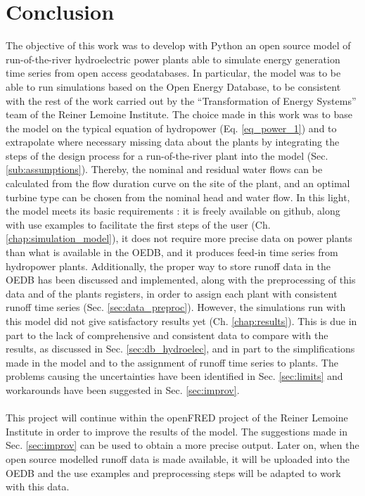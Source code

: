 \chapter{Conclusion}

The objective of this work was to develop with Python an open source model of run-of-the-river hydroelectric power plants able to simulate energy generation time series from open access geodatabases. In particular, the model was to be able to run simulations based on the Open Energy Database, to be consistent with the rest of the work carried out by the ``Transformation of Energy Systems'' team of the Reiner Lemoine Institute. \newline
The choice made in this work was to base the model on the typical equation of hydropower (Eq. \eqref{eq_power_1}) and to extrapolate where necessary missing data about the plants by integrating the steps of the design process for a run-of-the-river plant into the model (Sec. \ref{sub:assumptions}). Thereby, the nominal and residual water flows can be calculated from the flow duration curve on the site of the plant, and an optimal turbine type can be chosen from the nominal head and water flow. In this light, the model meets its basic requirements : it is freely available on github, along with use examples to facilitate the first steps of the user (Ch. \ref{chap:simulation_model}), it does not require more precise data on power plants than what is available in the OEDB, and it produces feed-in time series from hydropower plants. Additionally, the proper way to store runoff data in the OEDB has been discussed and implemented, along with the preprocessing of this data and of the plants registers, in order to assign each plant with consistent runoff time series (Sec. \ref{sec:data_preproc}). \newline
However, the simulations run with this model did not give satisfactory results yet (Ch. \ref{chap:results}). This is due in part to the lack of comprehensive and consistent data to compare with the results, as discussed in Sec. \ref{sec:db_hydroelec}, and in part to the simplifications made in the model and to the assignment of runoff time series to plants. The problems causing the uncertainties have been identified in Sec. \ref{sec:limits} and workarounds have been suggested in Sec. \ref{sec:improv}. \\ \\
This project will continue within the openFRED project of the Reiner Lemoine Institute in order to improve the results of the model. The suggestions made in Sec. \ref{sec:improv} can be used to obtain a more precise output. Later on, when the open source modelled runoff data is made available, it will be uploaded into the OEDB and the use examples and preprocessing steps will be adapted to work with this data.\newline
